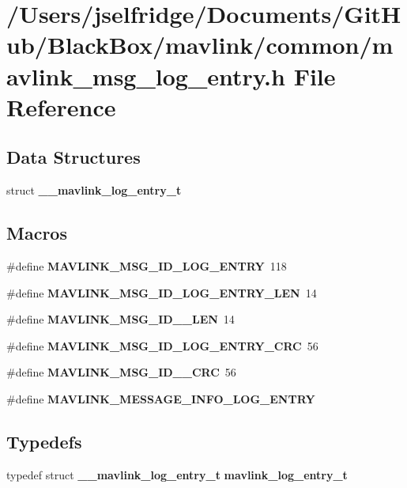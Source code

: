 \section{/\+Users/jselfridge/\+Documents/\+Git\+Hub/\+Black\+Box/mavlink/common/mavlink\+\_\+msg\+\_\+log\+\_\+entry.h File Reference}
\label{mavlink__msg__log__entry_8h}
\subsection*{Data Structures}
\begin{DoxyCompactItemize}
\item 
struct \textbf{ \+\_\+\+\_\+mavlink\+\_\+log\+\_\+entry\+\_\+t}
\end{DoxyCompactItemize}
\subsection*{Macros}
\begin{DoxyCompactItemize}
\item 
\#define \textbf{ M\+A\+V\+L\+I\+N\+K\+\_\+\+M\+S\+G\+\_\+\+I\+D\+\_\+\+L\+O\+G\+\_\+\+E\+N\+T\+RY}~118
\item 
\#define \textbf{ M\+A\+V\+L\+I\+N\+K\+\_\+\+M\+S\+G\+\_\+\+I\+D\+\_\+\+L\+O\+G\+\_\+\+E\+N\+T\+R\+Y\+\_\+\+L\+EN}~14
\item 
\#define \textbf{ M\+A\+V\+L\+I\+N\+K\+\_\+\+M\+S\+G\+\_\+\+I\+D\+\_\+\_\+\+L\+EN}~14
\item 
\#define \textbf{ M\+A\+V\+L\+I\+N\+K\+\_\+\+M\+S\+G\+\_\+\+I\+D\+\_\+\+L\+O\+G\+\_\+\+E\+N\+T\+R\+Y\+\_\+\+C\+RC}~56
\item 
\#define \textbf{ M\+A\+V\+L\+I\+N\+K\+\_\+\+M\+S\+G\+\_\+\+I\+D\+\_\+\_\+\+C\+RC}~56
\item 
\#define \textbf{ M\+A\+V\+L\+I\+N\+K\+\_\+\+M\+E\+S\+S\+A\+G\+E\+\_\+\+I\+N\+F\+O\+\_\+\+L\+O\+G\+\_\+\+E\+N\+T\+RY}
\end{DoxyCompactItemize}
\subsection*{Typedefs}
\begin{DoxyCompactItemize}
\item 
typedef struct \textbf{ \+\_\+\+\_\+mavlink\+\_\+log\+\_\+entry\+\_\+t} \textbf{ mavlink\+\_\+log\+\_\+entry\+\_\+t}
\end{DoxyCompactItemize}


